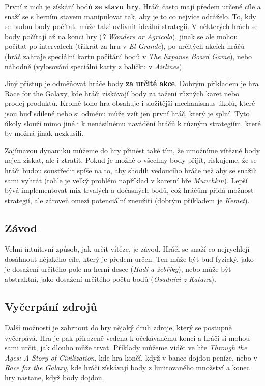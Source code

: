 První z nich je získání bodů \textbf{ze stavu hry}. Hráči často mají předem určené cíle a snaží se s herním stavem manipulovat tak, aby je to co nejvíce odráželo. To, kdy se budou body počítat, může také ovlivnit ideální strategii. V některých hrách se body počítají až na konci hry (\textit{7 Wonders or Agricola}), jinak se ale mohou počítat po intervalech (třikrát za hru v \textit{El Grande}), po určitých akcích hráčů (hráč zahraje speciální kartu počítání bodů v \textit{The Expanse Board Game}), nebo náhodně (vylosování speciální karty z balíčku v \textit{Airlines}).

Jiný přístup je odměňovat hráče body \textbf{za určité akce}. Dobrým příkladem je hra Race for the Galaxy, kde hráči získávají body za tažení různých karet nebo prodej produktů. Kromě toho hra obsahuje i složitější mechanismus úkolů, které jsou buď sdílené nebo si odměnu může vzít jen první hráč, který je splní. Tyto úkoly slouží mimo jiné i k nenásilnému navádění hráčů k různým strategiím, které by možná jinak nezkusili.

Zajímavou dynamiku můžeme do hry přinést také tím, že umožníme vítězné body nejen získat, ale i ztratit. Pokud je možné o všechny body přijít, riskujeme, že se hráči budou soustředit spíše na to, aby shodili vedoucího hráče než aby se snažili sami vyhrát (tohle je velký problém například v karetní hře \textit{Munchkin}). Lepší bývá implementovat mix trvalých a dočasných bodů, což hráčům přidá možnost strategií, ale zároveň omezí potenciální zneužití (dobrým příkladem je \textit{Kemet}).

\subsection{Závod}
\label{subsec:race}

Velmi intuitivní způsob, jak určit vítěze, je závod. Hráči se snaží co nejrychleji dosáhnout nějakého cíle, který je předem určen. Ten může být buď fyzický, jako je dosažení určitého pole na herní desce (\textit{Hadi a žebříky}), nebo může být abstraktní, jako dosažení určitého počtu bodů (\textit{Osadníci z Katanu}).

\subsection{Vyčerpání zdrojů}
\label{subsec:resource_depletion}

Další možností je zahrnout do hry nějaký druh zdroje, který se postupně vyčerpává. Hra je pak přirozeně vedena k očekávanému konci a hráči si mohou sami určit, jak dlouho může trvat. Příklady můžeme vidět ve hře \textit{Through the Ages: A Story of Civilization}, kde hra končí, když v bance dojdou peníze, nebo v \textit{Race for the Galaxy}, kde hráči získávají body z limitovaného množství a konec hry nastane, když body dojdou.

